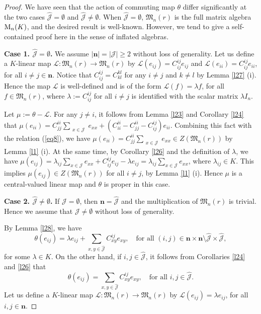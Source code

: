 \documentclass[reqno]{amsart}
\theoremstyle{plain}
\theoremstyle{definition}
\begin{document}
\begin{proof}
We have seen that the action of commuting map $\theta$
differ significantly at the two cases
$\hat{\mathcal{J}} = \emptyset$ and $\hat{\mathcal{J}} \neq \emptyset$. When $\hat{\mathcal{J}} = \emptyset$,
$\mathfrak{M}_n(r)$ is the full matrix algebra ${\rm M}_n(K)$,
and the desired result is well-known. However, we tend to give a self-contained proof here in the sense of inflated algebras.

\textbf{Case 1. $\hat{\mathcal{J}} = \emptyset$.}
We assume $|\mathbf{n}| = |\mathcal{J}| \geq 2$ without loss
of generality.
Let us define a $K$-linear map $\mathcal{L}: \mathfrak{M}_n(r) \to \mathfrak{M}_n(r)$ by $\mathcal{L}(e_{ij}) = C_{ij}^{ij} e_{ij}$ and $\mathcal{L}(e_{ii}) = C_{ij}^{ij} e_{ii}$, for all $i \neq j\in\mathbf{n}$.
Notice that $C_{ij}^{ij} = C_{kl}^{kl}$ for any $i \neq j$ and $k\neq l$ by Lemma \ref{l27} (i). Hence the map $\mathcal{L}$ is well-defined and is of the form $\mathcal{L}(f) = \lambda f$, for all $f \in \mathfrak{M}_n(r)$, where
$\lambda := C_{ij}^{ij}$ for all
$i \neq j$ is identified with the scalar matrix $\lambda I_n$.

Let $\mu := \theta - \mathcal{L}$. For any $j \neq i$,
it follows from Lemma \ref{l23} and Corollary \ref{l24} that
$\mu(e_{ii}) = C_{jj}^{ii} \sum_{\substack{x \in \mathcal{J}}} e_{xx} + \left( C_{ii}^{ii} - C_{jj}^{ii} - C_{ij}^{ij} \right) e_{ii}$. Combining this fact with the relation (\ref{eq8}), we have $\mu(e_{ii}) = C_{jj}^{ii} \sum_{\substack{x \in \mathcal{J} }} e_{xx} \in Z(\mathfrak{M}_n(r))$ by Lemma \ref{l1} (i). At the same time,
by Corollary \ref{l26} and the definition of $\lambda$,
we have $\mu(e_{ij}) = \lambda_{ij} \sum_{x \in \mathcal{J}} e_{xx} + C_{ij}^{ij} e_{ij} - \lambda e_{ij} = \lambda_{ij} \sum_{x \in \mathcal{J}} e_{xx}$, where $\lambda_{ij} \in K$.
This implies $\mu(e_{ij}) \in Z(\mathfrak{M}_n(r))$ for all $i \neq j$, by Lemma \ref{l1} (i). Hence $\mu$ is a central-valued linear map and $\theta$ is proper in this case.

\textbf{Case 2. $\hat{\mathcal{J}}\neq \emptyset$.}
If $\mathcal{J} = \emptyset$, then $\mathbf{n} = \hat{\mathcal{J}}$ and the multiplication of $\mathfrak{M}_n(r)$ is trivial. Hence we assume that $\mathcal{J} \neq \emptyset$ without loss of generality. 

By Lemma \ref{l28}, we have 
$$\theta(e_{ij}) = \lambda e_{ij} + \sum_{x,y \in \hat{\mathcal{J}} } C_{xy}^{ij} e_{xy}, \quad \text{for all } (i,j) \in \mathbf{n} \times \mathbf{n} \setminus \hat{\mathcal{J}} \times \hat{\mathcal{J}},$$ 
for some $\lambda \in K$. On the other hand, if $i,j \in \hat{\mathcal{J}}$, it follows from Corollaries \ref{l24} and \ref{l26} that
\[
\theta(e_{ij}) = \sum_{x,y \in \hat{\mathcal{J}} } C_{xy}^{ij} e_{xy},  \quad \text{for all } i,j\in \hat{\mathcal{J}}.
\]
Let us define a $K$-linear map $\mathcal{L}: \mathfrak{M}_n(r) \to \mathfrak{M}_n(r)$ by $\mathcal{L}(e_{ij}) = \lambda e_{ij}$, for all $i,j \in \mathbf{n}$. 


\end{proof}
\end{document}
